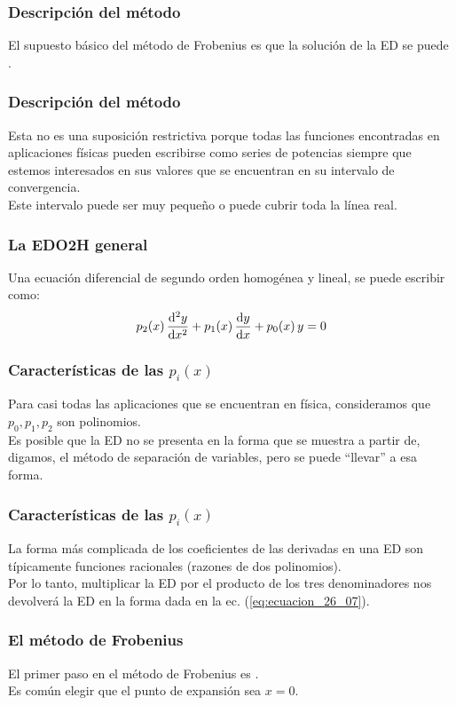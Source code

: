 \documentclass[12pt]{beamer}
\begin{document}
\begin{frame}
\frametitle{Descripción del método}
El supuesto básico del método de Frobenius es que la solución de la ED se puede .
\end{frame}
\begin{frame}
\frametitle{Descripción del método}
Esta no es una suposición restrictiva porque todas las funciones encontradas en aplicaciones físicas pueden escribirse como series de potencias siempre que estemos interesados en sus valores que se encuentran en su intervalo de convergencia.
\\
\bigskip
\pause
Este intervalo puede ser muy pequeño o puede cubrir toda la línea real.
\end{frame}
\begin{frame}
\frametitle{La EDO2H general}
Una ecuación diferencial de segundo orden homogénea y lineal, se puede escribir como:
\pause
\begin{align}
p_{2} (x) \, \dv[2]{y}{x} + p_{1} (x) \, \dv{y}{x} + p_{0}(x) \, y = 0
\label{eq:ecuacion_26_07}    
\end{align}
\end{frame}
\begin{frame}
\frametitle{Características de las $p_{i}(x)$}
Para casi todas las aplicaciones que se encuentran en física, consideramos que $p_{0}, p_{1}, p_{2}$ son polinomios.
\\
\bigskip
\pause
Es posible que la ED no se presenta en la forma que se muestra a partir de, digamos, el método de separación de variables, pero se puede \enquote{llevar} a esa forma.
\end{frame}
\begin{frame}
\frametitle{Características de las $p_{i}(x)$}
La forma más complicada de los coeficientes de las derivadas en una ED son típicamente funciones racionales (razones de dos polinomios).
\\
\bigskip
\pause
Por lo tanto, multiplicar la ED por el producto de los tres denominadores nos devolverá la ED en la forma dada en la ec. (\ref{eq:ecuacion_26_07}).
\end{frame}
\begin{frame}
\frametitle{El método de Frobenius}
El primer paso en el método de Frobenius es .
\\
\bigskip
\pause
Es común elegir que el punto de expansión sea $x = 0$.
\end{frame}
\end{document}
